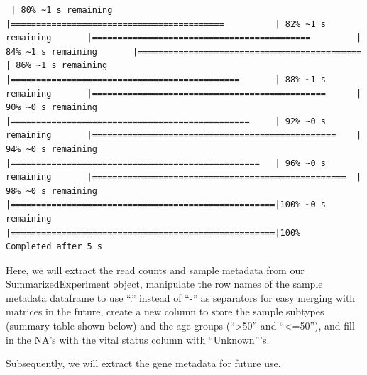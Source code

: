 \documentclass[
]{article}
\begin{document}
\begin{verbatim}
 | 80% ~1 s remaining       |==========================================          | 82% ~1 s remaining       |===========================================         | 84% ~1 s remaining       |============================================        | 86% ~1 s remaining       |=============================================       | 88% ~1 s remaining       |==============================================      | 90% ~0 s remaining       |===============================================     | 92% ~0 s remaining       |================================================    | 94% ~0 s remaining       |=================================================   | 96% ~0 s remaining       |==================================================  | 98% ~0 s remaining       |====================================================|100% ~0 s remaining       |====================================================|100%                      Completed after 5 s
\end{verbatim}

Here, we will extract the read counts and sample metadata from our
SummarizedExperiment object, manipulate the row names of the sample
metadata dataframe to use ``.'' instead of ``-'' as separators for easy
merging with matrices in the future, create a new column to store the
sample subtypes (summary table shown below) and the age groups
(``\textgreater50'' and ``\textless=50''), and fill in the NA's with the
vital status column with ``Unknown'''s.

Subsequently, we will extract the gene metadata for future use.
\end{document}
